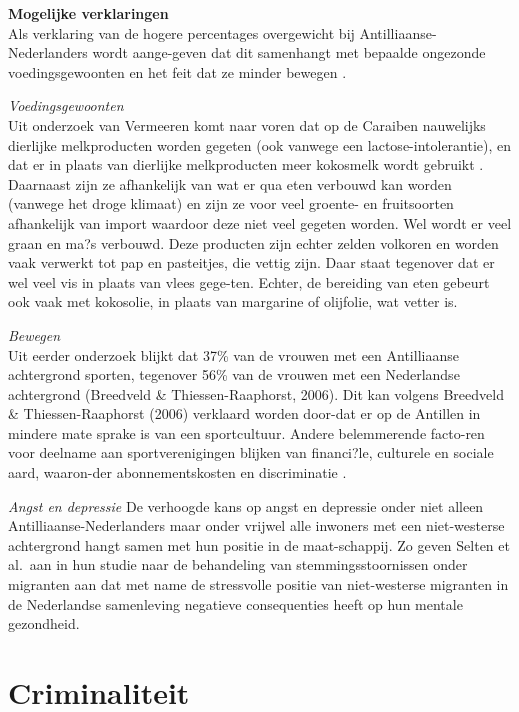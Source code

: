 \documentclass[]{book}
\begin{document}
\textbf{Mogelijke verklaringen}\\
Als verklaring van de hogere percentages overgewicht bij
Antilliaanse-Nederlanders wordt aange-geven dat dit samenhangt met
bepaalde ongezonde voedingsgewoonten en het feit dat ze minder bewegen
\citep{VanWijk2010}.

\emph{Voedingsgewoonten}\\
Uit onderzoek van Vermeeren komt naar voren dat op de Caraiben
nauwelijks dierlijke melkproducten worden gegeten (ook vanwege een
lactose-intolerantie), en dat er in plaats van dierlijke melkproducten
meer kokosmelk wordt gebruikt \citep{Vermeeren2007}. Daarnaast zijn ze
afhankelijk van wat er qua eten verbouwd kan worden (vanwege het droge
klimaat) en zijn ze voor veel groente- en fruitsoorten afhankelijk van
import waardoor deze niet veel gegeten worden. Wel wordt er veel graan
en ma?s verbouwd. Deze producten zijn echter zelden volkoren en worden
vaak verwerkt tot pap en pasteitjes, die vettig zijn. Daar staat
tegenover dat er wel veel vis in plaats van vlees gege-ten. Echter, de
bereiding van eten gebeurt ook vaak met kokosolie, in plaats van
margarine of olijfolie, wat vetter is.

\emph{Bewegen}\\
Uit eerder onderzoek blijkt dat 37\% van de vrouwen met een Antilliaanse
achtergrond sporten, tegenover 56\% van de vrouwen met een Nederlandse
achtergrond (Breedveld \& Thiessen-Raaphorst, 2006). Dit kan volgens
Breedveld \& Thiessen-Raaphorst (2006) verklaard worden door-dat er op
de Antillen in mindere mate sprake is van een sportcultuur. Andere
belemmerende facto-ren voor deelname aan sportverenigingen blijken van
financi?le, culturele en sociale aard, waaron-der abonnementskosten en
discriminatie \citep{Vermeeren2007}.

\emph{Angst en depressie} De verhoogde kans op angst en depressie onder
niet alleen Antilliaanse-Nederlanders maar onder vrijwel alle inwoners
met een niet-westerse achtergrond hangt samen met hun positie in de
maat-schappij. Zo geven Selten et al.~aan in hun studie naar de
behandeling van stemmingsstoornissen onder migranten aan dat met name de
stressvolle positie van niet-westerse migranten in de Nederlandse
samenleving negatieve consequenties heeft op hun mentale
gezondheid\citep{Selten2012}.

\hypertarget{criminaliteit}{%
\chapter*{Criminaliteit}\label{criminaliteit}}
\end{document}
